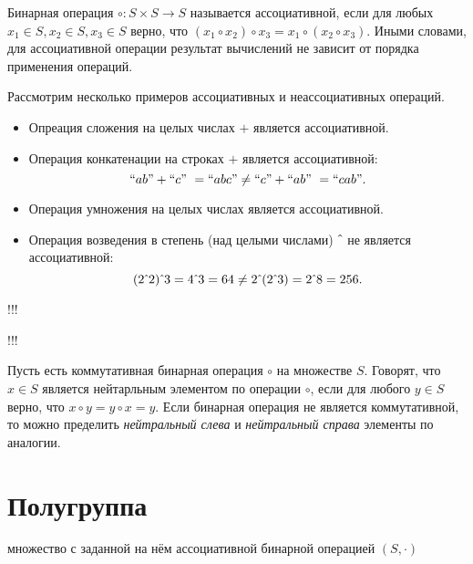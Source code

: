 \begin{definition}[Ассоциативность]
Бинарная операция $\circ : S \times S \to S$ называется ассоциативной, если для любых  $x_1 \in S, x_2 \in S, x_3 \in S$ верно, что  $(x_1 \circ x_2) \circ x_3 = x_1 \circ (x_2 \circ x_3)$. Иными словами, для ассоциативной операции результат вычислений не зависит от порядка применения операций.
\end{definition}

\begin{example} Рассмотрим несколько примеров ассоциативных и неассоциативных операций.
	\begin{itemize}
		\item Опреация сложения на целых числах $+$ является ассоциативной.
		\item Операция конкатенации на строках $+$ является ассоциативной: $$``ab" + ``c" \ = ``abc" \neq ``c" + ``ab" \ = ``cab".$$
		\item Операция умножения на целых числах является ассоциативной.
		\item Операция возведения в степень (над целыми числами) $\hat{\mkern6mu}$ не является ассоциативной:
		$$(2\hat{\mkern6mu}2)\hat{\mkern6mu}3 = 4 \hat{\mkern6mu} 3 = 64 \neq 2\hat{\mkern6mu}(2\hat{\mkern6mu}3) = 2 \hat{\mkern6mu} 8  = 256.$$
	\end{itemize}
\end{example}


\begin{definition}[дистрибутивность]
!!!
\end{definition}

\begin{definition}[идемпотентность]
!!!
\end{definition}

\begin{definition}
Пусть есть коммутативная бинарная операция $\circ$ на множестве $S$. Говорят, что $x\in S$ является нейтарльным элементом по операции $\circ$, если для любого $y\in S$ верно, что $x \circ y = y \circ x = y$. Если бинарная операция не является коммутативной, то можно пределить \textit{нейтральный слева} и \textit{нейтральный справа} элементы по аналогии.
\end{definition}


\section{Полугруппа}


множество с заданной на нём ассоциативной бинарной операцией $(S,\cdot )$ 



